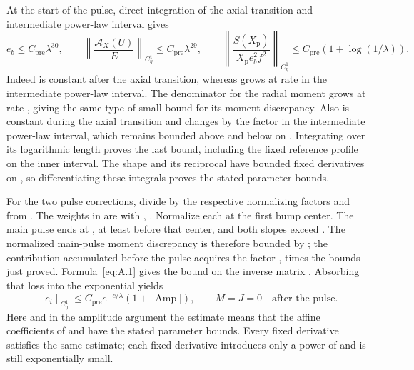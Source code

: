 At the start of the pulse, direct integration of the axial transition and intermediate power-law
interval gives
\begin{equation}
e_b\le C_{\mathrm{pre}}\lambda^{30},
\qquad
\left\lVert\frac{\mathcal A_X(U)}{E}\right\rVert_{C_\eta^1}
 \le C_{\mathrm{pre}}\lambda^{29},
\qquad
\left\lVert\frac{S(X_{\mathrm p})}{X_{\mathrm p}e_b^2f^2}\right\rVert_{C_\eta^1}
 \le C_{\mathrm{pre}}(1+\log(1/\lambda)).
\tag{A.14}\label{eq:A.14}
\end{equation}
Indeed  is constant after the axial transition, whereas
 grows at rate  in the intermediate
power-law interval. The denominator  for the
 radial moment grows at rate , giving
the same type of small bound for its moment discrepancy. Also  is
constant during the axial transition and changes by the factor
 in the intermediate power-law interval, which remains
bounded above and below on . Integrating over its
logarithmic length proves the last bound, including the fixed reference profile on the inner interval.
The shape  and its reciprocal have bounded fixed derivatives on
, so differentiating these integrals proves the stated parameter bounds.

For the two pulse corrections, divide by the respective normalizing factors
 and  from
. The weights in  are
 with
, . Normalize
each at the first bump center. The main pulse ends at , at least
 before that center, and both slopes exceed
. The normalized main-pulse moment discrepancy is therefore bounded by
; the contribution accumulated
before the pulse acquires the factor , times the
bounds just proved. Formula~\eqref{eq:A.1} gives the bound on the inverse matrix
. Absorbing that loss into the exponential yields
\begin{equation}
\lVert c_i\rVert_{C_\eta^1}
 \le C_{\mathrm{pre}}e^{-c/\lambda}(1+|\operatorname{Amp}|),
\qquad
M=J=0\quad\text{after the pulse}.
\tag{A.15}\label{eq:A.15}
\end{equation}
Here and in the amplitude argument the estimate means that the affine coefficients of
 and  have the stated
parameter bounds. Every fixed  derivative satisfies the same estimate;
each fixed  derivative introduces only a power of
 and is still exponentially small.

